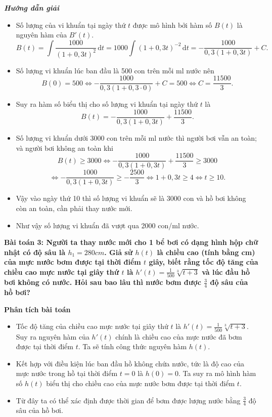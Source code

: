 \documentclass[12pt,a4paper]{article}
\newcommand{\dd}{\,\mathrm{d}}
\newcommand{\analysis}{\noindent\raisebox{0.15ex}{\rule{1.6ex}{1.6ex}}\hspace{4pt}\textbf{Phân tích bài toán}\par}
\newcommand{\solution}{\begin{center}\textbf{\textit{Hướng dẫn giải}}\end{center}\par}
\begin{document}
\solution
\begin{itemize}
\item Số lượng của vi khuẩn tại ngày thứ $t$ được mô hình bởi hàm số $B(t)$ là nguyên hàm của $B'(t)$.
\[
B(t)=\int\frac{1000}{(1+0,3t)^2}\dd t
=1000\int(1+0,3t)^{-2}\dd t
=-\frac{1000}{0,3(1+0,3t)}+C.
\]
\item Số lượng vi khuẩn lúc ban đầu là 500 con trên mỗi ml nước nên
\[
B(0)=500\Leftrightarrow-\frac{1000}{0,3(1+0,3\cdot0)}+C=500\Leftrightarrow C=\frac{11500}{3}.
\]
\item Suy ra hàm số biểu thị cho số lượng vi khuẩn tại ngày thứ $t$ là
\[
B(t)=-\frac{1000}{0,3(1+0,3t)}+\frac{11500}{3}.
\]
\item Số lượng vi khuẩn dưới 3000 con trên mỗi ml nước thì người bơi vẫn an toàn; và người
bơi không an toàn khi
\[
B(t)\ge3000\Leftrightarrow-\frac{1000}{0,3(1+0,3t)}+\frac{11500}{3}\ge3000
\]
\[
\Leftrightarrow-\frac{1000}{0,3(1+0,3t)}\ge-\frac{2500}{3}
\Leftrightarrow1+0,3t\ge4\Leftrightarrow t\ge10.
\]
\item Vậy vào ngày thứ 10 thì số lượng vi khuẩn sẽ là 3000 con và hồ bơi không còn an toàn, cần phải thay nước mới.
\item Như vậy số lượng vi khuẩn đã vượt qua 2000 con/ml nước.
\end{itemize}

\textbf{Bài toán 3: Người ta thay nước mới cho 1 bể bơi có dạng hình hộp chữ nhật có độ sâu là $h_1=280cm$. Giả sử $h(t)$ là chiều cao (tính bằng cm) của mực nước bơm được tại thời điểm $t$ giây, biết rằng tốc độ tăng của chiều cao mực nước tại giây thứ $t$ là $h'(t)=\frac1{500}\sqrt[3]{t+3}$ và lúc đầu hồ bơi không có nước. Hỏi sau bao lâu thì nước bơm được $\frac34$ độ sâu của hồ bơi?}\par\medskip
\begin{analysisbox}
\analysis
\begin{itemize}
\item Tốc độ tăng của chiều cao mực nước tại giây thứ $t$ là $h'(t)=\frac1{500}\sqrt[3]{t+3}$. Suy ra nguyên hàm của $h'(t)$ chính là chiều cao của mực nước đã bơm được tại thời điểm $t$. Ta sẽ tính công thức nguyên hàm $h(t)$.
\item Kết hợp với điều kiện lúc ban đầu hồ không chứa nước, tức là độ cao của mực nước trong hồ tại thời điểm $t=0$ là $h(0)=0$. Ta suy ra mô hình hàm số $h(t)$ biểu thị cho chiều cao của mực nước bơm được tại thời điểm $t$.
\item Từ đây ta có thể xác định được thời gian để bơm được lượng nước bằng $\frac34$ độ sâu của hồ bơi.
\end{itemize}
\end{analysisbox}
\end{document}
